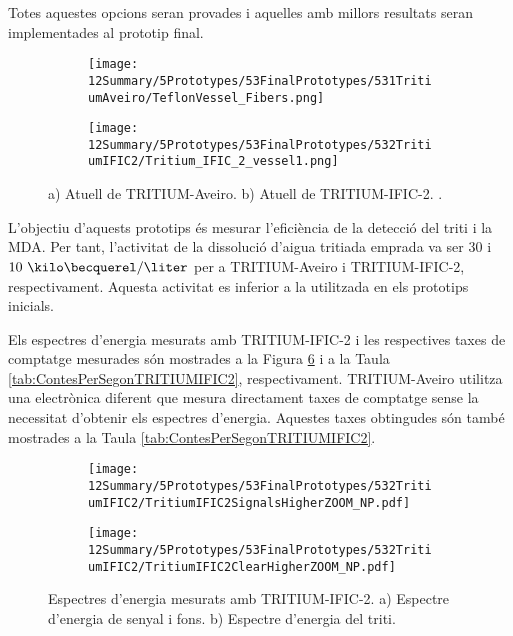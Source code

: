 Totes aquestes opcions seran provades i aquelles amb millors resultats seran implementades al prototip final.
\begin{figure}
\centering
    \begin{subfigure}[b]{0.5\textwidth}
    \centering
    \texttt{[image: 12Summary/5Prototypes/53FinalPrototypes/531TritiumAveiro/TeflonVessel\_Fibers.png]}  
        \caption{}\label{subfig:PrototipAveiro}
    \end{subfigure}
    \hfill
    \begin{subfigure}[b]{0.5\textwidth}
    \centering
    \texttt{[image: 12Summary/5Prototypes/53FinalPrototypes/532TritiumIFIC2/Tritium\_IFIC\_2\_vessel1.png]}  
    \caption{\label{subfig:PrototipIFIC2}}
    \end{subfigure}
\caption{a) Atuell de TRITIUM-Aveiro. b) Atuell de TRITIUM-IFIC-2. \label{fig:PrototipsAveiroIFIC2}.}
\end{figure}
L'objectiu d'aquests prototips és mesurar l'eficiència de la detecció del triti i la MDA. Per tant, l'activitat de la dissolució d'aigua tritiada emprada va ser $30$ i $10~\kilo\becquerel/\liter$ per a TRITIUM-Aveiro i TRITIUM-IFIC-2, respectivament. Aquesta activitat es inferior a la utilitzada en els prototips inicials.

Els espectres d'energia mesurats amb TRITIUM-IFIC-2 i les respectives taxes de comptatge mesurades són  mostrades a la Figura \ref{fig:EspectresEnergeticsTRITIUMIFIC2} i a la Taula \ref{tab:ContesPerSegonTRITIUMIFIC2}, respectivament. TRITIUM-Aveiro utilitza una electrònica diferent que mesura directament taxes de comptatge sense la necessitat d'obtenir els espectres d'energia. Aquestes taxes obtingudes són també mostrades a la Taula \ref{tab:ContesPerSegonTRITIUMIFIC2}.

\begin{figure}
\centering
    \begin{subfigure}[b]{1\textwidth}
    \centering
    \texttt{[image: 12Summary/5Prototypes/53FinalPrototypes/532TritiumIFIC2/TritiumIFIC2SignalsHigherZOOM\_NP.pdf]}  
    \caption{\label{subfig:EspectreEnergeticSenyalFonsTritiumIFIC2}}
    \end{subfigure}
    \hfill
    \begin{subfigure}[b]{1\textwidth}
    \centering
    \texttt{[image: 12Summary/5Prototypes/53FinalPrototypes/532TritiumIFIC2/TritiumIFIC2ClearHigherZOOM\_NP.pdf]}  
    \caption{\label{subfig:EspectreEnergeticTritiTritiumIFIC2}}
    \end{subfigure}
 \caption{Espectres d'energia mesurats amb TRITIUM-IFIC-2. a) Espectre d'energia de senyal i fons. b) Espectre d'energia del triti.}
 \label{fig:EspectresEnergeticsTRITIUMIFIC2}
\end{figure}

